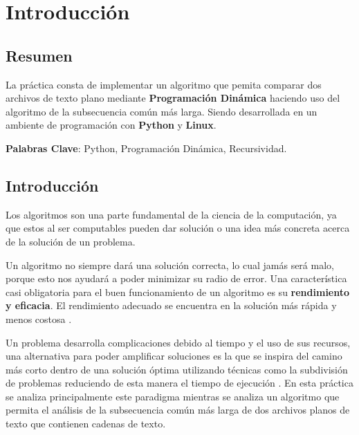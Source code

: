 
\chapter{Introducción}



\section{Resumen}
    La práctica consta de implementar un algoritmo que pemita comparar dos archivos de texto plano mediante \textbf{Programación Dinámica} haciendo uso del algoritmo de la subsecuencia común más larga. Siendo desarrollada en un ambiente de programación con \textbf{Python} y \textbf{Linux}.
    
    \textbf{Palabras Clave}: Python, Programación Dinámica, Recursividad.

\section{Introducción}

    Los algoritmos son una parte fundamental de la ciencia de la computación, ya que estos al ser computables pueden dar solución o una idea más concreta acerca de la solución de un problema.
    
    Un algoritmo no siempre dará una solución correcta, lo cual jamás será malo, porque esto nos ayudará a poder minimizar su radio de error. Una característica casi obligatoria para el buen funcionamiento de un algoritmo es su \textbf{rendimiento y eficacia}. El rendimiento adecuado se encuentra en la solución más rápida y menos costosa \cite{Algorithm}.

    Un problema desarrolla complicaciones debido al tiempo y el uso de sus recursos, una alternativa para poder amplificar soluciones es la  que se inspira del camino más corto dentro de una solución óptima utilizando técnicas como la subdivisión de problemas reduciendo de esta manera el tiempo de ejecución \cite{Dinamica}. En esta práctica se analiza principalmente este paradigma mientras se analiza un algoritmo que permita el análisis de la subsecuencia común más larga de dos archivos planos de texto que contienen cadenas de texto. 



    
